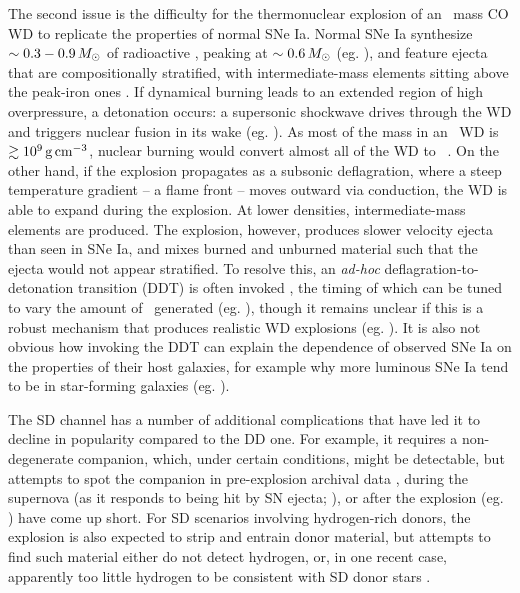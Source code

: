The second issue is the difficulty for the thermonuclear explosion of an \Mch\ mass CO WD to replicate the properties of normal SNe Ia.  Normal SNe Ia synthesize $\sim0.3 - 0.9\,\Msun$ of radioactive \Ni, peaking at $\sim0.6\,\Msun$ (eg. \citealt{stri+06, pirotk14}), and feature ejecta that are compositionally stratified, with intermediate-mass elements sitting above the peak-iron ones \citep{howe11, hill+13}.  If dynamical burning leads to an extended region of high overpressure, a detonation occurs: a supersonic shockwave drives through the WD and triggers nuclear fusion in its wake (eg. \citealt{seit+09}).  As most of the mass in an \Mch\ WD is $\gtrsim10^9\,\gcc$, nuclear burning would convert almost all of the WD to \Ni\ \citep{howe11, hill+13}.  On the other hand, if the explosion propagates as a subsonic deflagration, where a steep temperature gradient -- a flame front -- moves outward via conduction, the WD is able to expand during the explosion.  At lower densities, intermediate-mass elements are produced.  The explosion, however, produces slower velocity ejecta than seen in SNe Ia, and mixes burned and unburned material such that the ejecta would not appear stratified.  To resolve this, an \textit{ad-hoc} deflagration-to-detonation transition (DDT) is often invoked \citep{khok91}, the timing of which can be tuned to vary the amount of \Ni\ generated (eg. \citealt{hill+13}), though it remains unclear if this is a robust mechanism that produces realistic WD explosions (eg. \citealt{fishj15}).  It is also not obvious how invoking the DDT can explain the dependence of observed SNe Ia on the properties of their host galaxies, for example why more luminous SNe Ia tend to be in star-forming galaxies (eg. \citealt{hamu+00, sull+10}).

The SD channel has a number of additional complications \citep{maozmn14, tsebs15} that have led it to decline in popularity compared to the DD one.  For example, it requires a non-degenerate companion, which, under certain conditions, might be detectable, but attempts to spot the companion in pre-explosion archival data \citep{li+11cpn, nielvn13, niel+14}, during the supernova (as it responds to being hit by SN ejecta; \citealt{bloo+12,ollms15}), or after the explosion (eg. \citealt{kerz+14rem}) have come up short.  For SD scenarios involving hydrogen-rich donors, the explosion is also expected to strip and entrain donor material, but attempts to find such material either do not detect hydrogen, or, in one recent case, apparently too little hydrogen to be consistent with SD donor stars \citep{magu+16}.  


